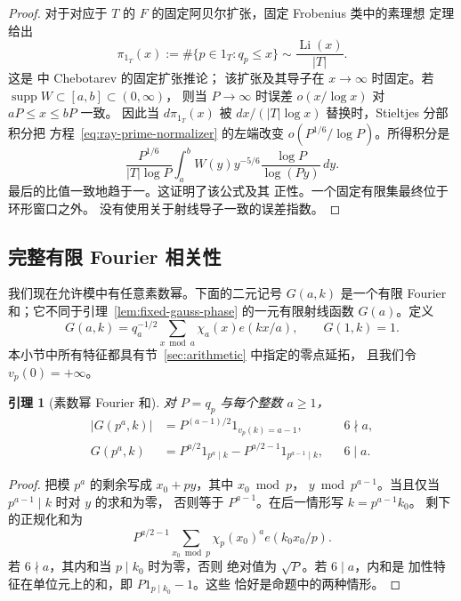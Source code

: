 \documentclass[11pt,a4paper]{article}
\numberwithin{equation}{section}
\numberwithin{figure}{section}
\newtheorem{lemma}[theorem]{引理}
\theoremstyle{definition}
\theoremstyle{remark}
\begin{document}
\begin{proof}
对于对应于 $T$ 的 $F$ 的固定阿贝尔扩张，固定 Frobenius 类中的素理想
定理给出
\[
 \pi_{1_T}(x):=\#\{p\in1_T:q_p\le x\}
       \sim\frac{\operatorname{Li}(x)}{|T|}.
\]
这是 \cite[定理 1.1]{TZ} 中 Chebotarev 的固定扩张推论；
该扩张及其导子在
$x\to\infty$ 时固定。若 $\operatorname{supp}W\subset[a,b]\subset(0,\infty)$，
则当 $P\to\infty$ 时误差 $o(x/\log x)$ 对 $aP\le x\le bP$ 一致。
因此当
$d\pi_{1_T}(x)$ 被 $dx/(|T|\log x)$ 替换时，Stieltjes 分部积分把
方程~\eqref{eq:ray-prime-normalizer} 的左端改变 $o(P^{1/6}/\log P)$。所得积分是
\[
 \frac{P^{1/6}}{|T|\log P}
 \int_a^b W(y)y^{-5/6}\frac{\log P}{\log(Py)}\,dy.
\]
最后的比值一致地趋于一。这证明了该公式及其
正性。一个固定有限集最终位于环形窗口之外。
没有使用关于射线导子一致的误差指数。
\end{proof}

\subsection{完整有限 Fourier 相关性}\label{sec:finite-correlations}

我们现在允许模中有任意素数幂。下面的二元记号
$G(a,k)$ 是一个有限 Fourier 和；它不同于引理~\ref{lem:fixed-gauss-phase}
的一元有限射线函数 $G(a)$。定义
\begin{equation}
 G(a,k)=q_a^{-1/2}\sum_{x\bmod a}\chi_a(x)e(kx/a),\qquad G(1,k)=1.
 \label{old-eq:2.4}
\end{equation}
本小节中所有特征都具有节~\ref{sec:arithmetic} 中指定的零点延拓，
且我们令 $v_p(0)=+\infty$。

\begin{lemma}[素数幂 Fourier 和]\label{lem:prime-power-fourier}
对 $P=q_p$ 与每个整数 $a\ge1$，
\begin{equation}
 \begin{aligned}
 |G(p^a,k)|&=P^{(a-1)/2}1_{v_p(k)=a-1},&&6\nmid a,\\
 G(p^a,k)&=P^{a/2}1_{p^a\mid k}
             -P^{a/2-1}1_{p^{a-1}\mid k},&&6\mid a.
 \end{aligned}
 \label{eq:gauss-local}
\end{equation}
\end{lemma}

\begin{proof}
把模 $p^a$ 的剩余写成 $x_0+py$，其中 $x_0\bmod p$，
$y\bmod p^{a-1}$。当且仅当 $p^{a-1}\mid k$ 时对 $y$ 的求和为零，
否则等于 $P^{a-1}$。在后一情形写 $k=p^{a-1}k_0$。
剩下的正规化和为
\[
 P^{a/2-1}\sum_{x_0\bmod p}\chi_p(x_0)^a e(k_0x_0/p).
\]
若 $6\nmid a$，其内和当 $p\mid k_0$ 时为零，否则
绝对值为 $\sqrt P$。若 $6\mid a$，内和是
加性特征在单位元上的和，即 $P1_{p\mid k_0}-1$。这些
恰好是命题中的两种情形。
\end{proof}
\end{document}
